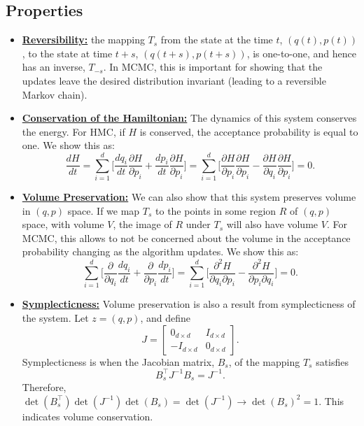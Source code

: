 \documentclass[twoside]{article}
\begin{document}
\subsection{Properties}
\begin{itemize}
    \item \underline{\textbf{Reversibility:}} the mapping $T_s$ from the state at the time $t$, $(q(t),p(t))$, to the state at time $t+s$, $(q(t+s),p(t+s))$, is one-to-one, and hence has an inverse, $T_{-s}$. In MCMC, this is important for showing that the updates leave the desired distribution invariant (leading to a reversible Markov chain).
    \item \underline{\textbf{Conservation of the Hamiltonian:}} The dynamics of this system conserves the energy. For HMC, if $H$ is conserved, the acceptance probability is equal to one. We show this as:
    $$\frac{dH}{dt} = \sum_{i=1}^d \Bigg[\frac{dq_i}{dt}\frac{\partial H}{\partial p_i} + \frac{dp_i}{dt}\frac{\partial H}{\partial p_i}\Bigg] = \sum_{i=1}^d \Bigg[\frac{\partial H}{\partial p_i}\frac{\partial H}{\partial p_i} - \frac{\partial H}{\partial q_i}\frac{\partial H}{\partial p_i}\Bigg] = 0.$$
    \item \underline{\textbf{Volume Preservation:}} We can also show that this system preserves volume in $(q,p)$ space. If we map $T_s$ to the points in some region $R$ of $(q,p)$ space, with volume $V$, the image of $R$ under $T_s$ will also have volume $V$. For MCMC, this allows to not be concerned about the volume in the acceptance probability changing as the algorithm updates. We show this as:
    $$ \sum_{i=1}^d \Bigg[\frac{\partial}{\partial q_i}\frac{dq_i}{dt} + \frac{\partial }{\partial p_i}\frac{dp_i}{dt}\Bigg] = \sum_{i=1}^d \Bigg[\frac{\partial^2 H}{\partial q_i \partial p_i} - \frac{\partial^2 H }{\partial p_i \partial q_i}\Bigg] = 0.$$
    \item \underline{\textbf{Symplecticness:}} Volume preservation is also a result from symplecticness of the system. Let $z=(q,p)$, and define
    $$J = \begin{bmatrix}
    0_{d \times d} & I_{d \times d} \\ -I_{d \times d} & 0_{d \times d}
    \end{bmatrix}.$$
    Symplecticness is when the Jacobian matrix, $B_s$, of the mapping $T_s$ satisfies
    $$B_s^\top J^{-1} B_s = J^{-1}.$$
    Therefore, $\det (B_s^\top) \det (J^{-1}) \det (B_s) = \det (J^{-1}) \rightarrow \det (B_s)^2 =1.$ This indicates volume conservation. 
\end{itemize}
\end{document}
